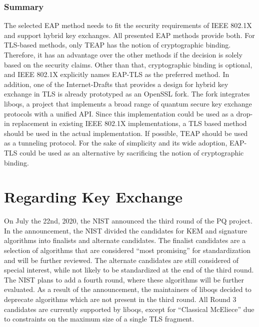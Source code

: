 \subsubsection{Summary}
The selected \ac{EAP} method needs to fit the security requirements of IEEE 802.1X and support hybrid key exchanges. All presented \ac{EAP} methods provide both. For TLS-based methods, only TEAP has the notion of cryptographic binding. Therefore, it has an advantage over the other methods if the decision is solely based on the security claims. Other than that, cryptographic binding is optional, and IEEE 802.1X explicitly names EAP-TLS as the preferred method. In addition, one of the Internet-Drafts that provides a design for hybrid key exchange in TLS is already prototyped as an OpenSSL fork\cite{crockett2019prototyping}. The fork integrates liboqs, a project that implements a broad range of quantum secure key exchange protocols with a unified API. Since this implementation could be used as a drop-in replacement in existing IEEE 802.1X implementations, a TLS based method should be used in the actual implementation. If possible, TEAP should be used as a tunneling protocol. For the sake of simplicity and its wide adoption, EAP-TLS could be used as an alternative by sacrificing the notion of cryptographic binding. 



\section{Regarding Key Exchange}

On July the 22nd, 2020, the \ac{NIST} announced the third round of the \ac{PQ} project. In the announcement, the \ac{NIST} divided the candidates for KEM and signature algorithms into finalists and alternate candidates. The finalist candidates are a selection of algorithms that are considered ``most promising'' for standardization and will be further reviewed. The alternate candidates are still considered of special interest, while not likely to be standardized at the end of the third round. The \ac{NIST} plans to add a fourth round, where these algorithms will be further evaluated. As a result of the announcement, the maintainers of liboqs decided to deprecate algorithms which are not present in the third round. All Round 3 candidates are currently supported by liboqs, except for ``Classical McEliece'' due to constraints on the maximum size of a single TLS fragment.


